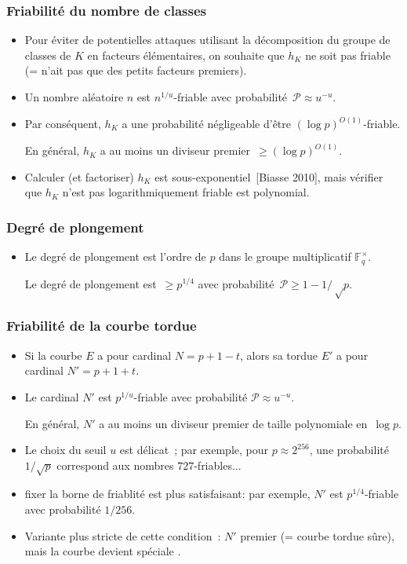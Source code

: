 \documentclass[francais]{beamer}
\newcommand{\F}{\mathbb{F}}
\newcommand{\prob}{\mathcal{P}}
\newcommand{\bib}[1]{{\usebeamercolor{emph}\textcolor{fg}{~[#1]}}}
\begin{document}
\begin{frame}\frametitle{Friabilité du nombre de classes}
\begin{itemize}
\item Pour éviter de potentielles attaques utilisant la décomposition
du groupe de classes de $K$ en facteurs élémentaires, on souhaite que
$h_K$ ne soit pas friable (= n'ait pas que des petits facteurs premiers).
\bigskip
\item Un nombre aléatoire $n$ est $n^{1/u}$-friable avec
probabilité~$\prob ≈ u^{-u}$.
\item Par conséquent, $h_K$ a une probabilité négligeable d'être
$(\log p)^{O(1)}$-friable.
\begin{block}{}
En général, $h_K$ a au moins un diviseur premier~$≥ (\log p)^{O(1)}$.
\end{block}
\item Calculer (et factoriser) $h_K$ est sous-exponentiel\bib{Biasse
2010}, mais vérifier que $h_K$ n'est pas logarithmiquement friable
est polynomial.
\end{itemize}
\end{frame}

\begin{frame}\frametitle{Degré de plongement}
\begin{itemize}
\item Le degré de plongement est l'ordre de $p$
dans le groupe multiplicatif $\F_q^{×}$.
\begin{block}{}
Le degré de plongement est~$≥ p^{1/4}$
avec probabilité~$\prob ≥ 1-1/√p$.
\end{block}
\end{itemize}
\end{frame}

\begin{frame}\frametitle{Friabilité de la courbe tordue}
\begin{itemize}
\item Si la courbe $E$ a pour cardinal $N = p + 1 - t$,
alors sa tordue $E'$ a pour cardinal $N' = p + 1 + t$.
\item Le cardinal $N'$ est $p^{1/u}$-friable
avec probabilité $\prob ≈ u^{-u}$.
\begin{block}{}
En général, $N'$ a au moins un diviseur premier
de taille polynomiale en~$\log p$.
\end{block}
\item Le choix du seuil $u$ est délicat ; par exemple, pour $p≈
2^{256}$, une probabilité~$1/\sqrt{p}$ correspond aux nombres
$727$-friables...
\item fixer la borne de friablité est plus satisfaisant:
par exemple, $N'$ est $p^{1/4}$-friable avec probabilité $1/256$.
\item Variante plus stricte de cette condition : $N'$ premier (= courbe
tordue sûre), mais la courbe devient \og spéciale \fg.
\end{itemize}
\end{frame}
\end{document}
